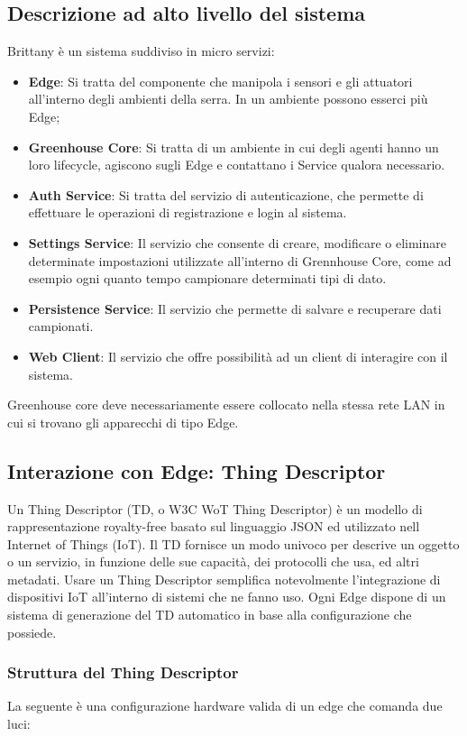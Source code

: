 \subsection{Descrizione ad alto livello del sistema}
Brittany è un sistema suddiviso in micro servizi:
\begin{itemize}
	\item \textbf{Edge}: Si tratta del componente che manipola i sensori e gli attuatori all’interno degli ambienti della serra. In un ambiente possono esserci più Edge;
	\item \textbf{Greenhouse Core}: Si tratta di un ambiente in cui degli agenti hanno un loro lifecycle, agiscono sugli Edge e contattano i Service qualora necessario.
	\item \textbf{Auth Service}: Si tratta del servizio di autenticazione, che permette di effettuare le operazioni di registrazione e login al sistema.
	\item \textbf{Settings Service}: Il servizio che consente di creare, modificare o eliminare determinate impostazioni utilizzate all’interno di Grennhouse Core, come ad esempio ogni quanto tempo campionare determinati tipi di dato.
	\item \textbf{Persistence Service}: Il servizio che permette di salvare e recuperare dati campionati.
	\item \textbf{Web Client}: Il servizio che offre possibilità ad un client di interagire con il sistema.
\end{itemize}
Greenhouse core deve necessariamente essere collocato nella stessa rete LAN in cui si trovano gli apparecchi di tipo Edge.

\subsection{Interazione con Edge: Thing Descriptor}
Un Thing Descriptor (TD, o W3C WoT Thing Descriptor) è un modello di rappresentazione royalty-free basato sul linguaggio JSON ed utilizzato nell Internet of Things (IoT). Il TD fornisce un modo univoco per descrive un oggetto o un servizio, in funzione delle sue capacità, dei protocolli che usa, ed altri metadati. Usare un Thing Descriptor semplifica notevolmente l’integrazione di dispositivi IoT all’interno di sistemi che ne fanno uso. Ogni Edge dispone di un sistema di generazione del TD automatico in base alla configurazione che possiede.

\subsubsection{Struttura del Thing Descriptor}
La seguente è una configurazione hardware valida di un edge che comanda due luci:

